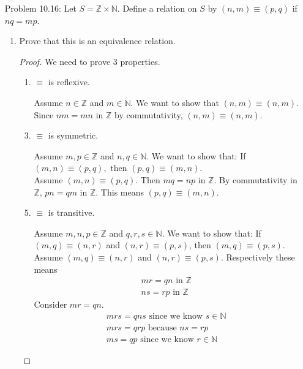 \documentclass{article}
\theoremstyle{claim}
\theoremstyle{definition}
\begin{document}
\begin{enumerate}
    \item[Problem 10.16:] Let $S = \mathbb{Z} \times \mathbb{N}$. Define a relation on $S$ by $(n, m) \equiv (p, q)$ if $nq = mp$.
        \begin{enumerate}
            \item Prove that this is an equivalence relation.
            \begin{proof}
                We need to prove 3 properties.
                \begin{enumerate}
                    \item $\equiv$ is reflexive.
                    \item[] Assume $n \in \mathbb{Z}$ and $m \in \mathbb{N}$. We want to show that $(n, m) \equiv (n, m)$. Since $nm = mn$ in $\mathbb{Z}$ by commutativity, $(n, m) \equiv (n, m)$.
                    \item $\equiv$ is symmetric.
                    \item[] Assume $m, p \in \mathbb{Z}$ and $n, q \in \mathbb{N}$. We want to show that: If $(m, n) \equiv (p, q), \text{ then } (p, q) \equiv (m, n)$.\\
                        Assume $(m, n) \equiv (p, q)$. Then $mq = np$ in $\mathbb{Z}$. By commutativity in $\mathbb{Z}$, $pn = qm$ in $\mathbb{Z}$. This means $(p, q) \equiv (m, n)$.
                    \item $\equiv$ is transitive.
                    \item[] Assume $m, n, p \in \mathbb{Z}$ and $q, r, s \in \mathbb{N}$. We want to show that: If $(m, q) \equiv (n, r)$ and $(n, r) \equiv (p, s)$, then $(m, q) \equiv (p, s)$.\\
                        Assume $(m, q) \equiv (n, r)$ and $(n, r) \equiv (p, s)$. Respectively these means
                        \begin{gather*}
                            mr = qn \text{ in } \mathbb{Z}\\
                            ns = rp \text{ in } \mathbb{Z}
                        \end{gather*}
                        Consider $mr = qn$.
                        \begin{gather*}
                            mrs = qns \text{ since we know } s \in \mathbb{N}\\
                            mrs = qrp \text{ because } ns = rp\\
                            ms = qp \text{ since we know } r \in \mathbb{N}
                        \end{gather*}

\end{enumerate}
\end{proof}
\end{enumerate}
\end{enumerate}
\end{document}
